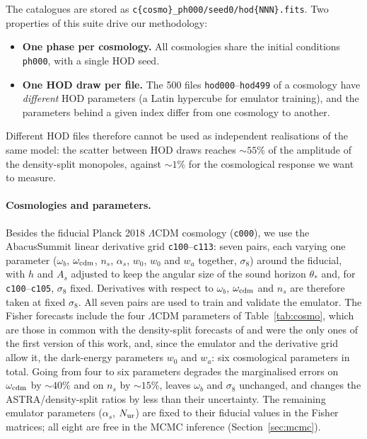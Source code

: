\documentclass[11pt,twocolumn]{article}
\begin{document}
The catalogues are stored as \texttt{c\{cosmo\}\_ph000/seed0/hod\{NNN\}.fits}. Two properties of this suite drive our methodology:
\begin{itemize}
\item \textbf{One phase per cosmology.} All cosmologies share the initial conditions \texttt{ph000}, with a single HOD seed.
\item \textbf{One HOD draw per file.} The 500 files \texttt{hod000}--\texttt{hod499} of a cosmology have \emph{different} HOD parameters (a Latin hypercube for emulator training), and the parameters behind a given index differ from one cosmology to another.
\end{itemize}
Different HOD files therefore cannot be used as independent realisations of the same model: the scatter between HOD draws reaches $\sim55\%$ of the amplitude of the density-split monopoles, against $\sim1\%$ for the cosmological response we want to measure.

\paragraph{Cosmologies and parameters.} Besides the fiducial Planck 2018 $\Lambda$CDM cosmology (\texttt{c000}), we use the AbacusSummit linear derivative grid \texttt{c100}--\texttt{c113}: seven pairs, each varying one parameter ($\omega_b$, $\omega_{\rm cdm}$, $n_s$, $\alpha_s$, $w_0$, $w_0$ and $w_a$ together, $\sigma_8$) around the fiducial, with $h$ and $A_s$ adjusted to keep the angular size of the sound horizon $\theta_*$ and, for \texttt{c100}--\texttt{c105}, $\sigma_8$ fixed. Derivatives with respect to $\omega_b$, $\omega_{\rm cdm}$ and $n_s$ are therefore taken at fixed $\sigma_8$. All seven pairs are used to train and validate the emulator. The Fisher forecasts include the four $\Lambda$CDM parameters of Table~\ref{tab:cosmo}, which are those in common with the density-split forecasts of \cite{Paillas2023} and were the only ones of the first version of this work, and, since the emulator and the derivative grid allow it, the dark-energy parameters $w_0$ and $w_a$: six cosmological parameters in total. Going from four to six parameters degrades the marginalised errors on $\omega_{\rm cdm}$ by $\sim40\%$ and on $n_s$ by $\sim15\%$, leaves $\omega_b$ and $\sigma_8$ unchanged, and changes the ASTRA/density-split ratios by less than their uncertainty. The remaining emulator parameters ($\alpha_s$, $N_{\rm ur}$) are fixed to their fiducial values in the Fisher matrices; all eight are free in the MCMC inference (Section~\ref{sec:mcmc}).
\end{document}
